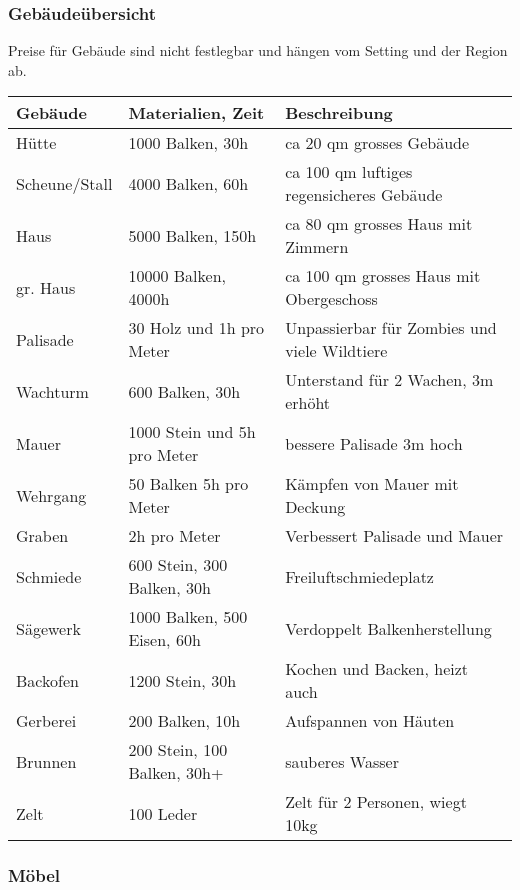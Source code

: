 \documentclass{article}
\begin{document}
\subsubsection{Gebäudeübersicht}

Preise für Gebäude sind nicht festlegbar und hängen vom Setting und der Region ab.


\begin{small}
\begin{tabular}{|m{3cm}|m{4cm}|m{6cm}|}
\hline
\textbf{Gebäude}&\textbf{Materialien, Zeit}&\textbf{Beschreibung}\\
\hline
\hline
Hütte&1000 Balken, 30h&ca 20 qm grosses Gebäude\\
\hline
Scheune/Stall&4000 Balken, 60h&ca 100 qm luftiges regensicheres Gebäude\\
\hline
Haus&5000 Balken, 150h&ca 80 qm grosses Haus mit Zimmern\\
\hline
gr. Haus&10000 Balken, 4000h&ca 100 qm grosses Haus mit Obergeschoss\\
\hline
Palisade&30 Holz und 1h pro Meter&Unpassierbar für Zombies und viele Wildtiere\\
\hline
Wachturm&600 Balken, 30h&Unterstand für 2 Wachen, 3m erhöht\\
\hline
Mauer&1000 Stein und 5h pro Meter&bessere Palisade 3m hoch\\
\hline
Wehrgang&50 Balken 5h pro Meter&Kämpfen von Mauer mit Deckung\\
\hline
Graben&2h pro Meter&Verbessert Palisade und Mauer\\
\hline
Schmiede&600 Stein, 300 Balken, 30h&Freiluftschmiedeplatz\\
\hline
Sägewerk&1000 Balken, 500 Eisen, 60h&Verdoppelt Balkenherstellung\\
\hline
Backofen&1200 Stein, 30h&Kochen und Backen, heizt auch\\
\hline
Gerberei&200 Balken, 10h&Aufspannen von Häuten\\
\hline
Brunnen&200 Stein, 100 Balken, 30h+&sauberes Wasser\\
\hline
Zelt&100 Leder&Zelt für 2 Personen, wiegt 10kg\\
\hline
\end{tabular}
\end{small}

\subsubsection{Möbel}
\end{document}
